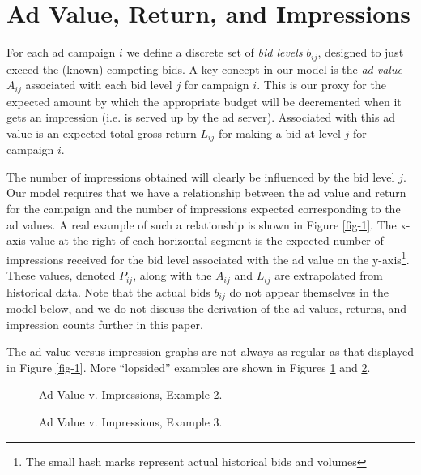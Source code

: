 \documentclass[finalversion,simpleeqnnos]{yrl}
\begin{document}
\section{Ad Value, Return, and Impressions}\label{ad-val}

For each ad campaign $i$ we define a discrete set of {\em bid levels} $b_{ij}$, designed to just exceed the (known) competing bids.
A key concept in our model is the {\em ad value} $A_{ij}$ associated with each bid level $j$ for campaign $i$. This is our proxy for the expected amount by which the appropriate budget will be decremented when it gets an impression (i.e. is served up by the ad server). Associated with this ad value is an expected total gross return $L_{ij}$ for making a bid at level $j$ for campaign $i$.

The number of impressions obtained will clearly be influenced by the bid level $j$.  Our model requires that we have a relationship between the ad value and return for the campaign and the number of impressions expected corresponding to the ad values. A real example of such a relationship is shown in Figure \ref{fig-1}. The x-axis value at the right of each horizontal segment is the expected number of impressions received for the bid level associated with the ad value on the y-axis\footnote{The small hash marks represent actual historical bids and volumes}. These values, denoted $P_{ij}$, along with the $A_{ij}$ and $L_{ij}$ are extrapolated from historical data. Note that the actual bids $b_{ij}$ do not appear themselves in the model below, and we do not discuss the derivation of the ad values, returns, and impression counts further in this paper.

The ad value versus impression graphs are not always as regular as that displayed in Figure \ref{fig-1}. More ``lopsided'' examples are shown in Figures \ref{fig-2} and \ref{fig-3}.
\begin{figure}[htfb]
\begin{center}
\hspace{0.0cm}
\caption{Ad Value v. Impressions, Example 2.} \label{fig-2}
\end{center}
\end{figure}


\begin{figure}[htfb]
\begin{center}
\hspace{0.0cm}
\caption{Ad Value v. Impressions, Example 3.} \label{fig-3}
\end{center}
\end{figure}
\end{document}
